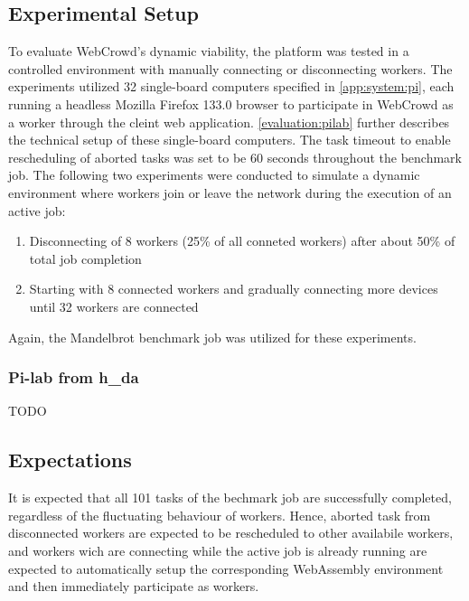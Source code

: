 \subsection{Experimental Setup}
To evaluate WebCrowd's dynamic viability, the platform was tested in a controlled environment with manually connecting or disconnecting workers. The experiments utilized 32 single-board computers specified in \autoref{app:system:pi}, each running a headless Mozilla Firefox 133.0 \cite{background:firefox2} browser to participate in WebCrowd as a worker through the cleint web application. \autoref{evaluation:pilab} further describes the technical setup of these single-board computers. The task timeout to enable rescheduling of aborted tasks was set to be 60 seconds throughout the benchmark job. The following two experiments were conducted to simulate a dynamic environment where workers join or leave the network during the execution of an active job:
\begin{enumerate}
    \item Disconnecting of 8 workers (25\% of all conneted workers) after about 50\% of total job completion 
    \item Starting with 8 connected workers and gradually connecting more devices until 32 workers are connected
\end{enumerate}
Again, the Mandelbrot benchmark job was utilized for these experiments.

\subsubsection{Pi-lab from h\_da}
\label{evaluation:pilab}
TODO

\subsection{Expectations}
It is expected that all 101 tasks of the bechmark job are successfully completed, regardless of the fluctuating behaviour of workers. Hence, aborted task from disconnected workers are expected to be rescheduled to other availabile workers, and workers wich are connecting while the active job is already running are expected to automatically setup the corresponding WebAssembly environment and then immediately participate as workers.

